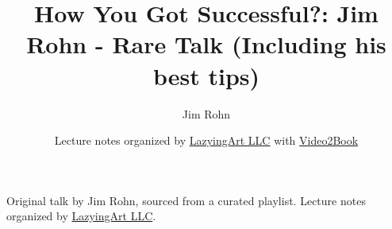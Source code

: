 \documentclass[11pt,oneside]{book}
\begin{document}
\frontmatter
\title{How You Got Successful?: Jim Rohn - Rare Talk (Including his best tips)}
\author{Jim Rohn}
\date{Lecture notes organized by \href{https://lazying.art}{LazyingArt LLC} with \href{https://github.com/lachlanchen/Video2Book}{Video2Book}}
\maketitle
\begin{center}
\small Original talk by Jim Rohn, sourced from a curated playlist. Lecture notes organized by \href{https://lazying.art}{LazyingArt LLC}.
\end{center}
\clearpage
\mainmatter

\end{document}
